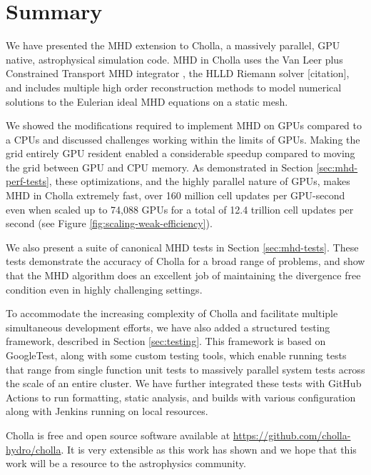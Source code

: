\section{Summary}
\label{sec:summary}

We have presented the MHD extension to Cholla, a massively parallel, GPU native, astrophysical simulation code. MHD in Cholla uses the Van Leer plus Constrained Transport MHD integrator \citep{stone_2009}, the HLLD Riemann solver [citation], and includes multiple high order reconstruction methods to model numerical solutions to the Eulerian ideal MHD equations on a static mesh.

We showed the modifications required to implement MHD on GPUs compared to a CPUs and discussed challenges working within the limits of GPUs. Making the grid entirely GPU resident enabled a considerable speedup compared to moving the grid between GPU and CPU memory. As demonstrated in Section \ref{sec:mhd-perf-tests}, these optimizations, and the highly parallel nature of GPUs, makes MHD in Cholla extremely fast, over 160 million cell updates per GPU-second even when scaled up to 74,088 GPUs for a total of 12.4 trillion cell updates per second (see Figure \ref{fig:scaling-weak-efficiency}).

We also present a suite of canonical MHD tests in Section \ref{sec:mhd-tests}. These tests demonstrate the accuracy of Cholla for a broad range of problems, and show that the MHD algorithm does an excellent job of maintaining the divergence free condition even in highly challenging settings. 

To accommodate the increasing complexity of Cholla and facilitate multiple simultaneous development efforts,  we have also added a structured testing framework, described in Section \ref{sec:testing}. This framework is based on  GoogleTest, along with some custom testing tools, which enable running tests that range from single function unit tests to massively parallel system tests across the scale of an entire cluster. We have further integrated these tests with GitHub Actions to run formatting, static analysis, and builds with various configuration along with Jenkins running on local resources.

Cholla is free and open source software available at \url{https://github.com/cholla-hydro/cholla}. It is very extensible as this work has shown and we hope that this work will be a resource to the astrophysics community.
